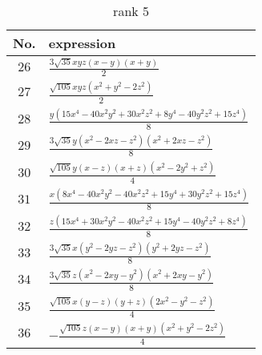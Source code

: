 \documentclass[fleqn,8pt,landscape]{jsarticle}
\begin{document}
\begin{table}[ht!]
\begin{center}
\caption{rank 5}
\renewcommand{\arraystretch}{1.3}
\begin{tabular}{cl} \hline \hline
No. & expression \\ \hline
$ 26 $ & $ \frac{3 \sqrt{35} x y z \left(x - y\right) \left(x + y\right)}{2} $ \\
$ 27 $ & $ \frac{\sqrt{105} x y z \left(x^{2} + y^{2} - 2 z^{2}\right)}{2} $ \\
$ 28 $ & $ \frac{y \left(15 x^{4} - 40 x^{2} y^{2} + 30 x^{2} z^{2} + 8 y^{4} - 40 y^{2} z^{2} + 15 z^{4}\right)}{8} $ \\
$ 29 $ & $ \frac{3 \sqrt{35} y \left(x^{2} - 2 x z - z^{2}\right) \left(x^{2} + 2 x z - z^{2}\right)}{8} $ \\
$ 30 $ & $ \frac{\sqrt{105} y \left(x - z\right) \left(x + z\right) \left(x^{2} - 2 y^{2} + z^{2}\right)}{4} $ \\
$ 31 $ & $ \frac{x \left(8 x^{4} - 40 x^{2} y^{2} - 40 x^{2} z^{2} + 15 y^{4} + 30 y^{2} z^{2} + 15 z^{4}\right)}{8} $ \\
$ 32 $ & $ \frac{z \left(15 x^{4} + 30 x^{2} y^{2} - 40 x^{2} z^{2} + 15 y^{4} - 40 y^{2} z^{2} + 8 z^{4}\right)}{8} $ \\
$ 33 $ & $ \frac{3 \sqrt{35} x \left(y^{2} - 2 y z - z^{2}\right) \left(y^{2} + 2 y z - z^{2}\right)}{8} $ \\
$ 34 $ & $ \frac{3 \sqrt{35} z \left(x^{2} - 2 x y - y^{2}\right) \left(x^{2} + 2 x y - y^{2}\right)}{8} $ \\
$ 35 $ & $ \frac{\sqrt{105} x \left(y - z\right) \left(y + z\right) \left(2 x^{2} - y^{2} - z^{2}\right)}{4} $ \\
$ 36 $ & $ - \frac{\sqrt{105} z \left(x - y\right) \left(x + y\right) \left(x^{2} + y^{2} - 2 z^{2}\right)}{4} $ \\
 \hline \hline
\end{tabular}
\end{center}
\end{table}
\end{document}
